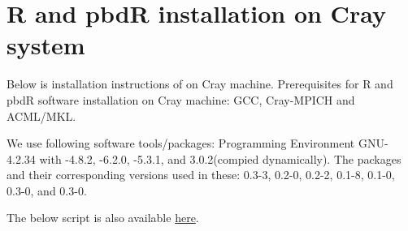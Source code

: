 \section{R and pbdR installation on Cray system }\label{sec:Roncray}

Below is installation instructions of  on Cray machine. 
Prerequisites for R and pbdR software installation on Cray machine: GCC, Cray-MPICH and ACML/MKL.

We use following software tools/packages: Programming Environment GNU-4.2.34 with -4.8.2, -6.2.0, -5.3.1, and  3.0.2(compied dynamically). The  packages and their corresponding versions used in these:  0.3-3,  0.2-0,  0.2-2,  0.1-8,  0.1-0,  0.3-0, and  0.3-0.

The below script is also available \href{../../../hpc/cray_pbdR.sh}{here}.

